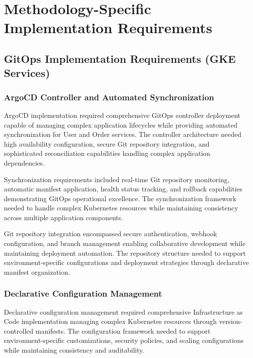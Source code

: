 \section{Methodology-Specific Implementation Requirements}

\subsection{GitOps Implementation Requirements (GKE Services)}

\subsubsection{ArgoCD Controller and Automated Synchronization}
ArgoCD implementation required comprehensive GitOps controller deployment capable of managing complex application lifecycles while providing automated synchronization for User and Order services. The controller architecture needed high availability configuration, secure Git repository integration, and sophisticated reconciliation capabilities handling complex application dependencies.

Synchronization requirements included real-time Git repository monitoring, automatic manifest application, health status tracking, and rollback capabilities demonstrating GitOps operational excellence. The synchronization framework needed to handle complex Kubernetes resources while maintaining consistency across multiple application components.

Git repository integration encompassed secure authentication, webhook configuration, and branch management enabling collaborative development while maintaining deployment automation. The repository structure needed to support environment-specific configurations and deployment strategies through declarative manifest organization.

\subsubsection{Declarative Configuration Management}
Declarative configuration management required comprehensive Infrastructure as Code implementation managing complex Kubernetes resources through version-controlled manifests. The configuration framework needed to support environment-specific customizations, security policies, and scaling configurations while maintaining consistency and auditability.


